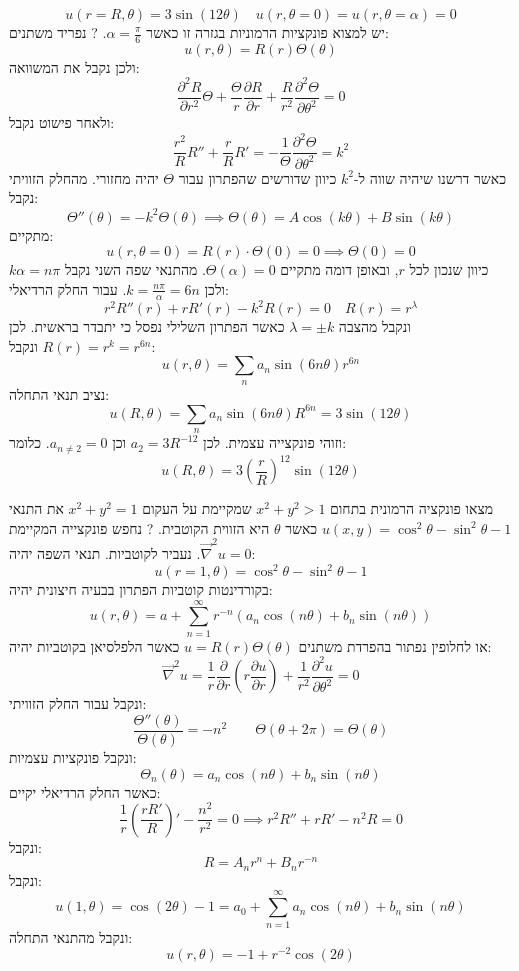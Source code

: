 \documentclass{tstextbook}
\begin{document}
$$u\left( r=R,\theta \right)=3\sin\left( 12\theta \right)\quad u\left( r,\theta=0 \right)=u\left( r,\theta=\alpha \right)=0$$
יש למצוא פונקציות הרמוניות בגזרה זו כאשר \(\alpha=\frac{\pi}{6}\).
?
נפריד משתנים:
$$u\left( r,\theta \right)=R(r)\Theta\left( \theta \right)$$
ולכן נקבל את המשוואה:
$$\frac{\partial ^2 R}{\partial r^2}\Theta +\frac{\Theta}{r}\frac{\partial R}{\partial r}+\frac{R}{r^2}\frac{\partial ^2\Theta}{\partial \theta^2}=0$$
ולאחר פישוט נקבל:
$$\frac{r^2}{R}R'' + \frac{r}{R}R'=-\frac{1}{\Theta}\frac{\partial ^2\Theta }{\partial \theta^2}=k^2$$
כאשר דרשנו שיהיה שווה ל-\(k^2\) כיוון שדורשים שהפתרון עבור \(\Theta\) יהיה מחזורי. מהחלק הזוויתי נקבל:
$$\Theta''\left( \theta \right)=-k^2 \Theta\left( \theta \right)\implies \Theta\left( \theta \right)={ A\cos\left( k\theta \right) }+B\sin\left( k\theta \right)$$
מתקיים:
$$u\left( r,\theta=0 \right)=R(r)\cdot \Theta(0)=0\implies \Theta(0)=0$$
כיוון שנכון לכל \(r\), ובאופן דומה מתקיים \(\Theta\left( \alpha \right)=0\). מהתנאי שפה השני נקבל \(k\alpha=n\pi\) ולכן \(k=\frac{n\pi}{\alpha}=6n\).
עבור החלק הרדיאלי:
$$r^2R''(r)+rR'(r)-k^2R(r)=0\quad R(r)=r^{\lambda}$$
ונקבל מהצבה \(\lambda=\pm k\) כאשר הפתרון השלילי נפסל כי יתבדר בראשית. לכן \(R(r)=r^{k}=r^{6n}\) ונקבל:
$$u\left( r,\theta \right)=\sum_{n}a_{n}\sin\left( 6n\theta \right)r^{6n}$$
נציב תנאי התחלה:
$$u\left( R,\theta \right)=\sum_{n}a_{n}\sin\left( 6n\theta \right)R^{6n}=3\sin\left( 12\theta \right)$$
וזוהי פונקצייה עצמית. לכן \(a_{2}=3R^{-12}\) וכן \(a_{n\neq 2}=0\). כלומר:
$$u\left( R,\theta \right)=3\left( \frac{r}{R} \right)^{12}\sin\left( 12\theta \right)$$

מצאו פונקציה הרמונית בתחום \(x^2+y^2>1\) שמקיימת על העקום \(x^2+y^2=1\) את התנאי \(u(x,y)=\cos^2\theta-\sin^2\theta-1\) כאשר \(\theta\) היא הזווית הקוטבית.
?
נחפש פונקצייה המקיימת \(\vec{\nabla} ^2u=0\). נעביר לקוטביות. תנאי השפה יהיה:
$$u\left( r=1,\theta \right)=\cos^2\theta-\sin^2\theta-1$$
בקורדינטות קוטביות הפתרון בבעיה חיצונית יהיה:
$$u\left( r,\theta \right)=a+\sum_{n=1}^\infty r^{-n}\left( a_{n}\cos\left( n\theta \right)+b_{n}\sin\left( n\theta \right) \right)$$
או לחלופין נפתור בהפרדת משתנים \(u=R(r)\Theta\left( \theta \right)\) כאשר הלפלסיאן בקוטביות יהיה:
$$\vec{\nabla} ^2u=\frac{1}{r}\frac{\partial }{\partial r}\left( r\frac{\partial u}{\partial r} \right)+\frac{1}{r^2}\frac{\partial ^2u}{\partial \theta^2}=0$$
ונקבל עבור החלק הזוויתי:
$$\frac{\Theta''\left( \theta \right)}{\Theta\left( \theta \right)}=-n^2\qquad \Theta\left( \theta+2\pi \right)=\Theta\left( \theta \right)$$
ונקבל פונקציות עצמיות:
$$\Theta_{n}\left( \theta \right)=a_{n}\cos\left( n\theta \right)+b_{n}\sin\left( n\theta \right)$$
כאשר החלק הרדיאלי יקיים:
$$\frac{1}{r}\left( \frac{rR'}{R} \right)'-\frac{n^2}{r^2}=0\implies r^2R''+rR'-n^2R=0$$
ונקבל:
$$R=A_{n}r^{n}+B_{n}r^{-n}$$
ונקבל:
$$u\left( 1,\theta \right)=\cos\left( 2\theta \right)-1=a_{0}+\sum_{n=1}^\infty a_{n}\cos\left( n\theta \right)+b_{n}\sin\left( n\theta \right)$$
ונקבל מהתנאי התחלה:
$$u\left( r,\theta \right)=-1+r^{-2}\cos\left( 2\theta \right)$$
\end{document}
